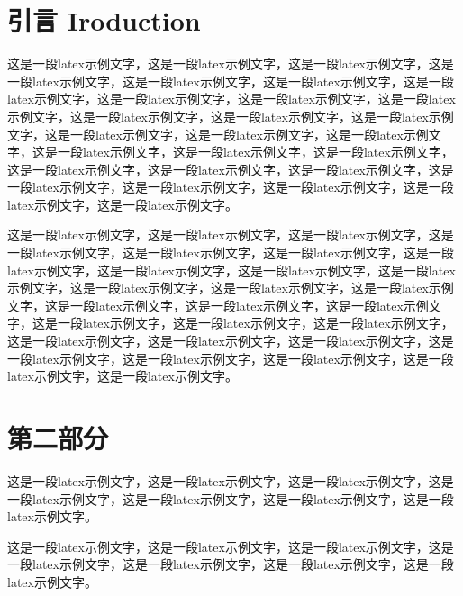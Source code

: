 \documentclass{template.cls} %
\begin{document}
\begin{multicols}{2}

    \section{引言 Iroduction}
这是一段latex示例文字\cite{reddy2013polypharmacology}，这是一段latex示例文字，这是一段latex示例文字，这是一段latex示例文字，这是一段latex示例文字，这是一段latex示例文字，这是一段latex示例文字，这是一段latex示例文字，这是一段latex示例文字，这是一段latex示例文字，这是一段latex示例文字，这是一段latex示例文字，这是一段latex示例文字，这是一段latex示例文字，这是一段latex示例文字，这是一段latex示例文字，这是一段latex示例文字，这是一段latex示例文字，这是一段latex示例文字，这是一段latex示例文字，这是一段latex示例文字，这是一段latex示例文字，这是一段latex示例文字，这是一段latex示例文字，这是一段latex示例文字，这是一段latex示例文字，这是一段latex示例文字。



这是一段latex示例文字\cite{li2020learn}，这是一段latex示例文字，这是一段latex示例文字，这是一段latex示例文字，这是一段latex示例文字，这是一段latex示例文字，这是一段latex示例文字，这是一段latex示例文字，这是一段latex示例文字，这是一段latex示例文字，这是一段latex示例文字，这是一段latex示例文字，这是一段latex示例文字，这是一段latex示例文字，这是一段latex示例文字，这是一段latex示例文字，这是一段latex示例文字，这是一段latex示例文字，这是一段latex示例文字，这是一段latex示例文字，这是一段latex示例文字，这是一段latex示例文字，这是一段latex示例文字，这是一段latex示例文字，这是一段latex示例文字，这是一段latex示例文字，这是一段latex示例文字。


    \section{第二部分}
这是一段latex示例文字\cite{reddy2013polypharmacology}，这是一段latex示例文字，这是一段latex示例文字，这是一段latex示例文字，这是一段latex示例文字，这是一段latex示例文字，这是一段latex示例文字。

这是一段latex示例文字\cite{li2020learn}，这是一段latex示例文字，这是一段latex示例文字，这是一段latex示例文字，这是一段latex示例文字，这是一段latex示例文字，这是一段latex示例文字。
    

\end{multicols}
\end{document}

